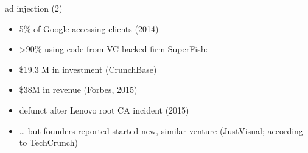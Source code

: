 \begin{frame}{ad injection (2)}
    \begin{itemize}
        \item 5\% of Google-accessing clients (2014)
        \item >90\% using code from VC-backed firm SuperFish:
        \vspace{.5cm}
            \item \$19.3 M in investment (CrunchBase)
            \item \$38M in revenue (Forbes, 2015)
            \item defunct after Lenovo root CA incident (2015)
            \item \ldots{} but founders reported started new, similar venture (JustVisual; according to TechCrunch)
    \end{itemize}
\end{frame}

